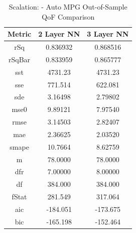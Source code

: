 \documentclass{article}
\begin{document}
\begin{table}[H]
\centering
\caption{Scalation: - Auto MPG Out-of-Sample QoF Comparison}
\label{tab:Scalation: - Auto MPG Out-of-Sample QoF Comparison}
\begin{tabular}{|c|c|c|} \hline 
Metric & 2 Layer NN & 3 Layer NN \\ \hline \hline 
rSq & 0.836932 & 0.868516 \\ \hline 
rSqBar & 0.833959 & 0.865777 \\ \hline 
sst & 4731.23 & 4731.23 \\ \hline 
sse & 771.514 & 622.081 \\ \hline 
sde & 3.16498 & 2.79802 \\ \hline 
mse0 & 9.89121 & 7.97540 \\ \hline 
rmse & 3.14503 & 2.82407 \\ \hline 
mae & 2.36625 & 2.03520 \\ \hline 
smape & 10.7664 & 8.62759 \\ \hline 
m & 78.0000 & 78.0000 \\ \hline 
dfr & 7.00000 & 8.00000 \\ \hline 
df & 384.000 & 384.000 \\ \hline 
fStat & 281.549 & 317.064 \\ \hline 
aic & -184.051 & -173.675 \\ \hline 
bic & -165.198 & -152.464 \\ \hline 
\end{tabular}
\end{table}
\end{document}
